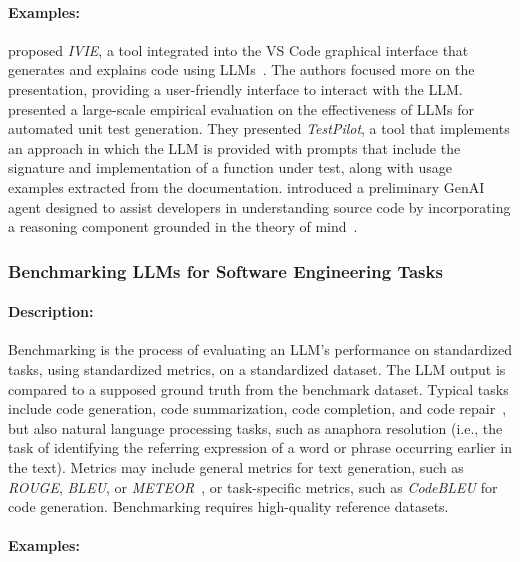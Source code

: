 \documentclass[smallextended]{svjour3}
\newcommand{\studytypesubsection}[1]{\subsubsection{#1}}
\newcommand{\studytypeparagraph}[1]{\paragraph{\bfseries #1:}}
\newcommand{\studytypesubsection}[1]{\subsection{#1}}
\newcommand{\studytypeparagraph}[1]{\subsubsection{#1}}
\begin{document}
\studytypeparagraph{Examples}

\citeauthor{DBLP:conf/chi/YanHWH24} proposed \emph{IVIE}, a tool integrated into the VS Code graphical interface that generates and explains code using LLMs~\cite{DBLP:conf/chi/YanHWH24}.
The authors focused more on the presentation, providing a user-friendly interface to interact with the LLM. 
\citeauthor{DBLP:journals/tse/SchaferNET24}~\cite{DBLP:journals/tse/SchaferNET24} presented a large-scale empirical evaluation on the effectiveness of LLMs for automated unit test generation.
They presented \emph{TestPilot}, a tool that implements an approach in which the LLM is provided with prompts that include the signature and implementation of a function under test, along with usage examples extracted from the documentation.
\citeauthor{DBLP:conf/icsm/RichardsW24} introduced a preliminary GenAI agent designed to assist developers in understanding source code by incorporating a reasoning component grounded in the theory of mind~\cite{DBLP:conf/icsm/RichardsW24}.
 
\studytypesubsection{Benchmarking LLMs for Software Engineering Tasks}
\label{sec:benchmarking-llms-for-software-engineering-tasks}

\studytypeparagraph{Description}

Benchmarking is the process of evaluating an LLM's performance on standardized tasks, using standardized metrics, on a standardized dataset. The LLM output is compared to a supposed ground truth from the benchmark dataset. Typical tasks include code generation, code summarization, code completion, and code repair~\cite{yang2025code}, but also natural language processing tasks, such as anaphora resolution (i.e., the task of identifying the referring expression of a word or phrase occurring earlier in the text). %
Metrics may include general metrics for text generation, such as \emph{ROUGE}, \emph{BLEU}, or \emph{METEOR}~\cite{DBLP:journals/tosem/HouZLYWLLLGW24}, or task-specific metrics, such as \emph{CodeBLEU} for code generation.  Benchmarking requires high-quality reference datasets.

\studytypeparagraph{Examples}
\end{document}
